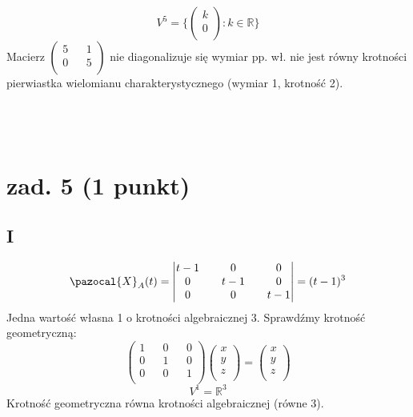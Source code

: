 \documentclass{article}
\begin{document}
$$
V^5 = \{\begin{pmatrix}
k\\
0\\
\end{pmatrix} : k \in \mathbb{R}\}
$$
Macierz $\begin{pmatrix}
5 && 1\\
0 && 5\\
\end{pmatrix}$ nie diagonalizuje się wymiar pp. wł.  nie jest równy krotności pierwiastka wielomianu charakterystycznego (wymiar 1, krotność 2).
\\\\\\\\
\section{zad. 5 (1 punkt)}
\subsection*{I}
$$\pazocal{X}_A(t) =
\begin{vmatrix}
t-1 && 0 && 0\\
0 && t-1 && 0\\
0 && 0 && t-1\\
\end{vmatrix} =
(t-1)^3
$$
Jedna wartość własna 1 o krotności algebraicznej 3. Sprawdźmy krotność geometryczną:
$$
\begin{pmatrix}
1 && 0 && 0\\
0 && 1 && 0\\
0 && 0 && 1\\
\end{pmatrix}
\begin{pmatrix}
x\\
y\\
z\\
\end{pmatrix} =
\begin{pmatrix}
x\\
y\\
z\\
\end{pmatrix}
$$
$$
V^1 = \mathbb{R}^3
$$
Krotność geometryczna równa krotności algebraicznej (równe 3).
\end{document}
